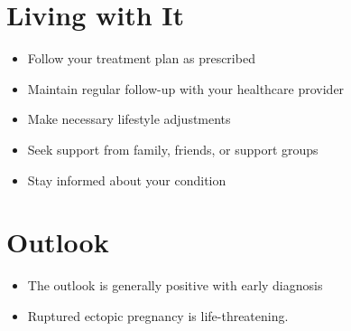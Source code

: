 \section{Living with It}
\begin{itemize}[noitemsep]
  \item Follow your treatment plan as prescribed
  \item Maintain regular follow-up with your healthcare provider
  \item Make necessary lifestyle adjustments
  \item Seek support from family, friends, or support groups
  \item Stay informed about your condition
\end{itemize}
\section{Outlook}
\begin{itemize}[noitemsep]
  \item The outlook is generally positive with early diagnosis
  \item Ruptured ectopic pregnancy is life-threatening.
\end{itemize}
